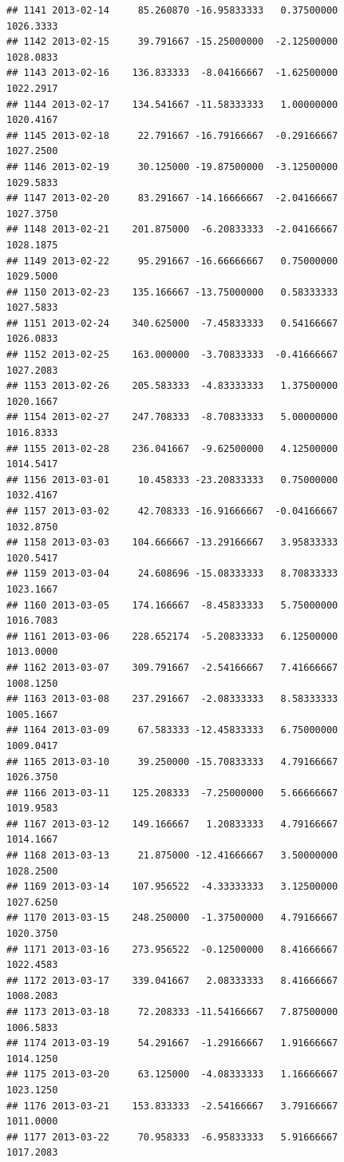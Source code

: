 \documentclass[
]{article}
\begin{document}
\begin{verbatim}
## 1141 2013-02-14     85.260870 -16.95833333   0.37500000    1026.3333
## 1142 2013-02-15     39.791667 -15.25000000  -2.12500000    1028.0833
## 1143 2013-02-16    136.833333  -8.04166667  -1.62500000    1022.2917
## 1144 2013-02-17    134.541667 -11.58333333   1.00000000    1020.4167
## 1145 2013-02-18     22.791667 -16.79166667  -0.29166667    1027.2500
## 1146 2013-02-19     30.125000 -19.87500000  -3.12500000    1029.5833
## 1147 2013-02-20     83.291667 -14.16666667  -2.04166667    1027.3750
## 1148 2013-02-21    201.875000  -6.20833333  -2.04166667    1028.1875
## 1149 2013-02-22     95.291667 -16.66666667   0.75000000    1029.5000
## 1150 2013-02-23    135.166667 -13.75000000   0.58333333    1027.5833
## 1151 2013-02-24    340.625000  -7.45833333   0.54166667    1026.0833
## 1152 2013-02-25    163.000000  -3.70833333  -0.41666667    1027.2083
## 1153 2013-02-26    205.583333  -4.83333333   1.37500000    1020.1667
## 1154 2013-02-27    247.708333  -8.70833333   5.00000000    1016.8333
## 1155 2013-02-28    236.041667  -9.62500000   4.12500000    1014.5417
## 1156 2013-03-01     10.458333 -23.20833333   0.75000000    1032.4167
## 1157 2013-03-02     42.708333 -16.91666667  -0.04166667    1032.8750
## 1158 2013-03-03    104.666667 -13.29166667   3.95833333    1020.5417
## 1159 2013-03-04     24.608696 -15.08333333   8.70833333    1023.1667
## 1160 2013-03-05    174.166667  -8.45833333   5.75000000    1016.7083
## 1161 2013-03-06    228.652174  -5.20833333   6.12500000    1013.0000
## 1162 2013-03-07    309.791667  -2.54166667   7.41666667    1008.1250
## 1163 2013-03-08    237.291667  -2.08333333   8.58333333    1005.1667
## 1164 2013-03-09     67.583333 -12.45833333   6.75000000    1009.0417
## 1165 2013-03-10     39.250000 -15.70833333   4.79166667    1026.3750
## 1166 2013-03-11    125.208333  -7.25000000   5.66666667    1019.9583
## 1167 2013-03-12    149.166667   1.20833333   4.79166667    1014.1667
## 1168 2013-03-13     21.875000 -12.41666667   3.50000000    1028.2500
## 1169 2013-03-14    107.956522  -4.33333333   3.12500000    1027.6250
## 1170 2013-03-15    248.250000  -1.37500000   4.79166667    1020.3750
## 1171 2013-03-16    273.956522  -0.12500000   8.41666667    1022.4583
## 1172 2013-03-17    339.041667   2.08333333   8.41666667    1008.2083
## 1173 2013-03-18     72.208333 -11.54166667   7.87500000    1006.5833
## 1174 2013-03-19     54.291667  -1.29166667   1.91666667    1014.1250
## 1175 2013-03-20     63.125000  -4.08333333   1.16666667    1023.1250
## 1176 2013-03-21    153.833333  -2.54166667   3.79166667    1011.0000
## 1177 2013-03-22     70.958333  -6.95833333   5.91666667    1017.2083

\end{verbatim}
\end{document}

